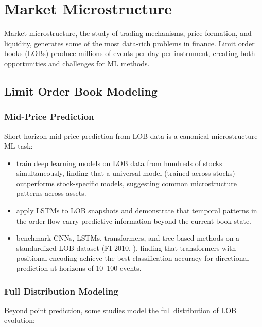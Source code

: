 \section{Market Microstructure}\label{sec:microstructure}

Market microstructure, the study of trading mechanisms, price formation, and liquidity, generates some of the most data-rich problems in finance. Limit order books (LOBs) produce millions of events per day per instrument, creating both opportunities and challenges for ML methods.

\subsection{Limit Order Book Modeling}

\subsubsection{Mid-Price Prediction}

Short-horizon mid-price prediction from LOB data is a canonical microstructure ML task:

\begin{itemize}[leftmargin=*]
    \item \citet{Sirignano2019} train deep learning models on LOB data from hundreds of stocks simultaneously, finding that a universal model (trained across stocks) outperforms stock-specific models, suggesting common microstructure patterns across assets.

    \item \citet{Zhang2019LOB} apply LSTMs to LOB snapshots and demonstrate that temporal patterns in the order flow carry predictive information beyond the current book state.

    \item \citet{Kolm2023} benchmark CNNs, LSTMs, transformers, and tree-based methods on a standardized LOB dataset (FI-2010, \citealt{Ntakaris2018}), finding that transformers with positional encoding achieve the best classification accuracy for directional prediction at horizons of 10--100 events.
\end{itemize}

\subsubsection{Full Distribution Modeling}

Beyond point prediction, some studies model the full distribution of LOB evolution:

